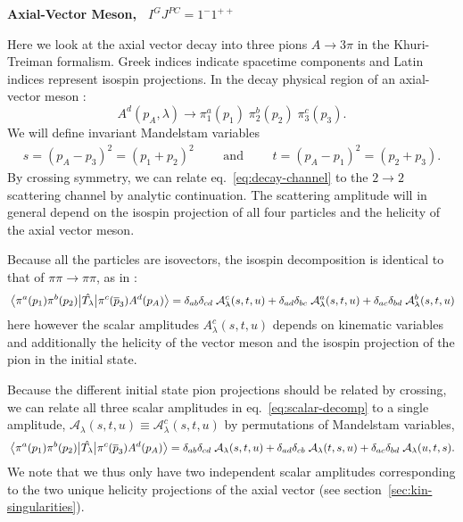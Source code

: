 \documentclass[10pt, aps,prd,amsmath,amssymb,superscriptaddress,onecolumn,
nofootinbib,showpacs,preprintnumbers]{revtex4-1}
\begin{document}
\begin{center}
\large \textbf{Axial-Vector Meson, \, \(I^G J^{PC} = 1^-1^{++}\)}
\end{center}

Here we look at the axial vector decay into three pions \(A \to 3\pi\) in the Khuri-Treiman formalism. Greek indices indicate spacetime components and Latin indices represent isospin projections.
In the decay physical region of an axial-vector meson :
  \begin{equation}
    \label{eq:decay-channel}
    A^d(p_A, \lambda) \rightarrow \pi_1^a(p_1)\;  \pi_2^b(p_2) \; \pi^c_3(p_3).
  \end{equation}
We will define invariant Mandelstam variables
  \begin{align}
    s = (p_A - p_3)^2 = (p_1 + p_2)^2 \qquad \text{ and } \qquad t = (p_A - p_1)^2 = (p_2 + p_3).
  \end{align}
By crossing symmetry, we can relate eq.~\ref{eq:decay-channel} to the \(2\to2\) scattering channel by analytic continuation. The scattering amplitude will in general depend on the isospin projection of all four particles and the helicity of the axial vector meson.

Because all the particles are isovectors, the isospin decomposition is identical to that of \(\pi\pi\to\pi\pi\), as in \cite{Albaladejo2018}:
  \begin{equation}
    \mel{\pi^a(p_1)\pi^b(p_2)}{\hat{T_\lambda}}{\pi^c(\overline{p}_3)A^d(p_A)} = \delta_{ab}\delta_{cd} \; \mathcal{A}^c_\lambda(s,t,u) + \delta_{ad}\delta_{bc} \; \mathcal{A}^a_\lambda(s,t,u) + \delta_{ac}\delta_{bd} \; \mathcal{A}^b_\lambda(s,t,u)
  \end{equation}
here however the scalar amplitudes \(A^c_\lambda(s,t,u)\) depends on kinematic variables and additionally the helicity of the vector meson and the isospin projection of the pion in the initial state.

Because the different initial state pion projections should be related by crossing, we can relate all three scalar amplitudes in eq.~\ref{eq:scalar-decomp} to a single amplitude, \(\mathcal{A}_\lambda(s,t,u) \equiv \mathcal{A}_\lambda^c(s,t,u)\) by permutations of Mandelstam variables,
\begin{equation}
  \label{eq:scalar-decomp}
  \mel{\pi^a(p_1)\pi^b(p_2)}{\hat{T_\lambda}}{\pi^c(\overline{p}_3)A^d(p_A)} = \delta_{ab}\delta_{cd} \; \mathcal{A}_\lambda(s,t,u) + \delta_{ad}\delta_{cb} \; \mathcal{A}_\lambda(t,s,u) + \delta_{ac}\delta_{bd} \; \mathcal{A}_\lambda(u,t,s).
\end{equation}
We note that we thus only have two independent scalar amplitudes corresponding to the two unique helicity projections of the axial vector (see section~\ref{sec:kin-singularities}).
\end{document}
